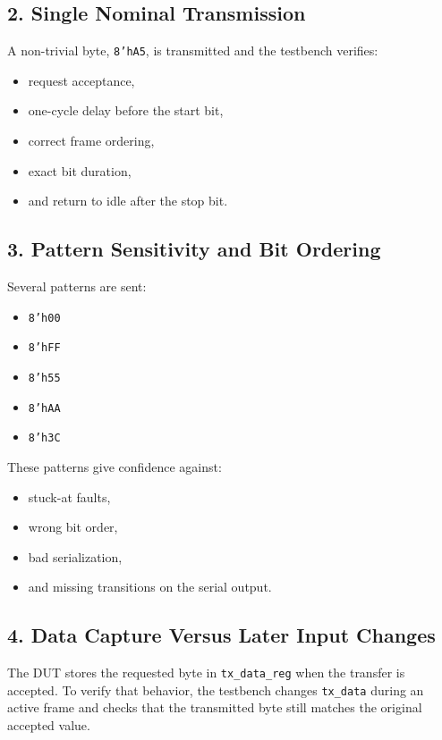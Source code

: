 \documentclass[12pt]{article}
\begin{document}
\subsection*{2. Single Nominal Transmission}

A non-trivial byte, \texttt{8'hA5}, is transmitted and the testbench verifies:

\begin{itemize}
    \item request acceptance,
    \item one-cycle delay before the start bit,
    \item correct frame ordering,
    \item exact bit duration,
    \item and return to idle after the stop bit.
\end{itemize}

\subsection*{3. Pattern Sensitivity and Bit Ordering}

Several patterns are sent:

\begin{itemize}
    \item \texttt{8'h00}
    \item \texttt{8'hFF}
    \item \texttt{8'h55}
    \item \texttt{8'hAA}
    \item \texttt{8'h3C}
\end{itemize}

These patterns give confidence against:

\begin{itemize}
    \item stuck-at faults,
    \item wrong bit order,
    \item bad serialization,
    \item and missing transitions on the serial output.
\end{itemize}

\subsection*{4. Data Capture Versus Later Input Changes}

The DUT stores the requested byte in \texttt{tx\_data\_reg} when the transfer is
accepted. To verify that behavior, the testbench changes \texttt{tx\_data}
during an active frame and checks that the transmitted byte still matches the
original accepted value.
\end{document}

